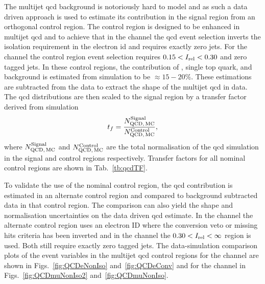 The multijet \acrshort{qcd} background is notoriously hard to model and as such a data driven approach is used to estimate its contribution in the signal region from an orthogonal control region.
The control region is designed to be enhanced in multijet \acrshort{qcd} and to achieve that in the \eJets{} channel the \acrshort{qcd} event selection inverts the isolation requirement in the electron \acrshort{id} and requires exactly zero \bquark{} jets.
For the \muJets{} channel the control region event selection requires $0.15<I_{\mathrm{rel}}<0.30$ and zero \bquark{} tagged jets.
In these control regions, the contribution of \ttbar{}, single top quark, and \Vjets{} background is estimated from simulation to be $\approx15-20\%$.
These estimations are subtracted from the data to extract the shape of the multijet \acrshort{qcd} in data.
The \acrshort{qcd} distributions are then scaled to the signal region by a transfer factor derived from simulation
\begin{equation*}
	t_{f}=\frac{N^{\mathrm{Signal}}_{\mathrm{QCD},\,\mathrm{MC}}}{N^{\mathrm{Control}}_{\mathrm{QCD},\,\mathrm{MC}}},
\end{equation*}
where $N^{\mathrm{Signal}}_{\mathrm{QCD},\,\mathrm{MC}}$ and $N^{\mathrm{Control}}_{\mathrm{QCD},\,\mathrm{MC}}$ are the total normalisation of the \acrshort{qcd} simulation in the signal and control regions respectively.
Transfer factors for all nominal control regions are shown in Tab.~\ref{tb:qcdTF}.


To validate the use of the nominal control region, the \acrshort{qcd} contribution is estimated in an alternate control region and compared to background subtracted data in that control region.
The comparison can also yield the shape and normalisation uncertainties on the data driven \acrshort{qcd} estimate.
In the \eJets{} channel the alternate control region uses an electron ID where the conversion veto or missing hits criteria has been inverted and in the \muJets{} channel the $0.30<I_{\mathrm{rel}}<\infty$ region is used.
Both still require exactly zero \bquark{} tagged jets.
The data-simulation comparison plots of the event variables in the multijet \acrshort{qcd} control regions for the \eJets{} channel are shown in Figs.~\ref{fig:QCDeNonIso} and~\ref{fig:QCDeConv} and for the \muJets{} channel in Figs.~\ref{fig:QCDmuNonIso2} and~\ref{fig:QCDmuNonIso}.

